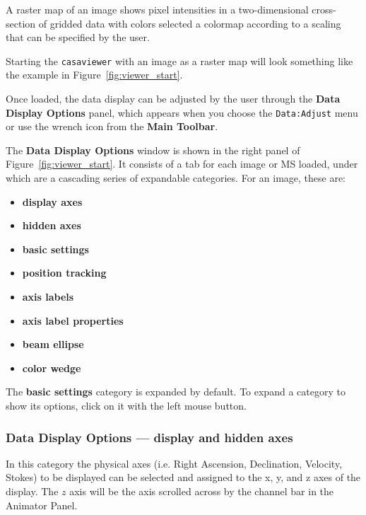 A raster map of an image shows pixel intensities in a two-dimensional
cross-section of gridded data with colors selected a colormap according
to a scaling that can be specified by the user. 


Starting the {\tt casaviewer} 
with an image as a raster map will look
something like the example in Figure~\ref{fig:viewer_start}. 

Once loaded, the data display can be adjusted by the user 
through the {\bf Data Display Options} panel, which
appears when you choose the {\tt Data:Adjust} menu or use the
wrench icon from the {\bf Main Toolbar}.

The {\bf Data Display Options} window is shown in the right panel
of Figure~\ref{fig:viewer_start}.  It consists of a tab for each
image or MS loaded, under which are a cascading series of expandable
categories.  For an image, these are:
\begin{itemize}
   \item {\bf display axes}
   \item {\bf hidden axes}
   \item {\bf basic settings}
   \item {\bf position tracking}
   \item {\bf axis labels}
   \item {\bf axis label properties}
   \item {\bf beam ellipse}
   \item {\bf color wedge}
\end{itemize}
The {\bf basic settings} category is expanded by
default.  To expand a category to show its options, click on it with
the left mouse button.


\subsubsection{Data Display Options --- display and hidden axes}
In this category the physical axes (i.e. Right Ascension, Declination,
Velocity, Stokes) to be displayed can be selected and assigned to the
x, y, and z axes of the display. The $z$ axis will be the axis scrolled across
by the channel bar in the Animator Panel.

